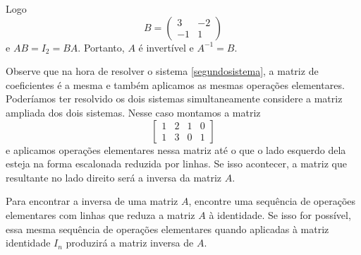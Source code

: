 Logo
\[
    B = \begin{pmatrix}
        3 & -2\\
        -1 & 1
    \end{pmatrix}
\]
e $AB = I_2 = BA$. Portanto, $A$ é invertível e $A^{-1} = B$.

Observe que na hora de resolver o sistema \eqref{segundosistema}, a matriz de coeficientes é a mesma e também  aplicamos as mesmas operações elementares. Poderíamos ter resolvido os dois sistemas simultaneamente considere a matriz ampliada dos dois sistemas. Nesse caso montamos a matriz
\[
    \left[\begin{array}{cc|cc}
        1 & 2 & 1 & 0\\
        1 & 3 & 0 & 1
    \end{array}\right]
\]
e aplicamos operações elementares nessa matriz até o que o lado esquerdo dela esteja na forma escalonada reduzida por linhas. Se isso acontecer, a matriz que resultante no lado direito será a inversa da matriz $A$.

\begin{observacao}
    Para encontrar a inversa de uma matriz $A$, encontre uma sequência de operações elementares com linhas que reduza a matriz $A$ à identidade. Se isso for possível, essa mesma sequência de operações elementares quando aplicadas à matriz identidade $I_n$ produzirá a matriz inversa de $A$.
\end{observacao}

